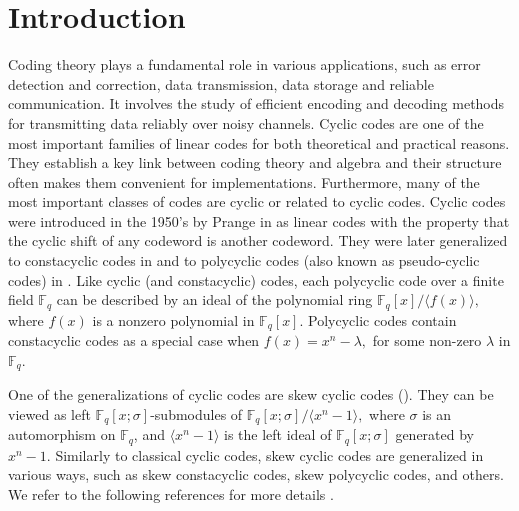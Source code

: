 \documentclass[12pt,paper]{article}
\theoremstyle{plain}
\newcommand{\Fq}{\mathbb{F}_{q}}
\begin{document}
\section{Introduction}
Coding theory plays a fundamental role in various applications, such as error detection and correction, data transmission, data storage and reliable communication. It involves the study of efficient encoding and decoding methods for transmitting data reliably over noisy channels. {Cyclic codes} are one of the most important families of linear codes for both theoretical and practical reasons. They establish a key link between coding theory and algebra and their structure often makes them convenient for implementations. Furthermore, many of the most important classes of codes are cyclic or related to cyclic codes. Cyclic codes were introduced in the 1950's by Prange in \cite{Prange1957} as linear codes with the property that the cyclic shift of any codeword is another codeword. They were later generalized to {constacyclic codes} in \cite{Berlekamp1968} and to {polycyclic codes} (also known as {pseudo-cyclic codes}) in \cite{10}.  Like cyclic (and constacyclic) codes, each polycyclic code over a finite field $\Fq$ can be described by an ideal of the polynomial ring $\Fq[x]/\langle f(x)\rangle,$ where $f(x)$ is a nonzero polynomial in $\Fq[x]$.  Polycyclic codes contain constacyclic codes as a special case when $f(x)=x^n-\lambda,$ for some non-zero $\lambda$ in $\Fq.$

One of the generalizations of cyclic codes are skew cyclic codes (\cite{Boucher2009,Boucher2014}). They can be viewed as left $\Fq[x;\sigma]$-submodules of $\Fq[x;\sigma] / \langle x^n-1\rangle,$ where $\sigma$ is an automorphism on $\mathbb{F}_q$, and $\langle x^n-1\rangle$ is the left ideal of $\Fq[x;\sigma]$ generated by $ x^n-1.$ Similarly to classical cyclic codes, skew cyclic codes are generalized in various ways, such as skew constacyclic codes, skew polycyclic  codes, and others. We refer to the following references for more details \cite{Almendras2018, Bag2025, Boulanouar2021, Ouazzou2023}.
\end{document}
